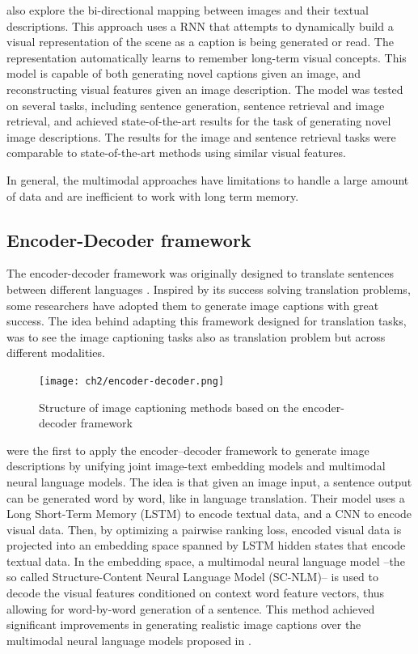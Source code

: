 \citet{Chen2015} also explore the bi-directional mapping between images and their textual descriptions. This approach uses a RNN that attempts to dynamically build a visual representation of the scene as a caption is being generated or read. The representation automatically learns to remember long-term visual concepts. This model is capable of both generating novel captions given an image, and reconstructing visual features given an image description. The model was tested on several tasks, including sentence generation, sentence retrieval and image retrieval, and achieved state-of-the-art results for the task of generating novel image descriptions. The results for the image and sentence retrieval tasks were comparable to state-of-the-art methods using similar visual features.

In general, the multimodal approaches have limitations to handle a large amount of data and are inefficient to work with long term memory.

\subsection{Encoder-Decoder framework}\label{sec:encoder-decoder_framework}

The encoder-decoder framework was originally designed to translate sentences between different languages \citep{Kalchbrenner2013, Sutskever2014, Cho2014}. Inspired by its success solving translation problems, some researchers have adopted them to generate image captions with great success. The idea behind adapting this framework designed for translation tasks, was to see the image captioning tasks also as translation problem but across different modalities. 

\begin{figure}[hpt]
	\centering
	\texttt{[image: ch2/encoder-decoder.png]}
	\caption{Structure of image captioning methods based on the encoder-decoder framework}
	\label{fig:encoder-decoder}
\end{figure}

\citet{Kiros2014_LBL} were the first to apply the encoder–decoder framework to generate image descriptions by unifying joint image-text embedding models and multimodal neural language models. The idea is that given an image input, a sentence output can be generated word by word, like in language translation. Their model uses a Long Short-Term Memory (LSTM) \citep{Hochreiter1997} to encode textual data, and a CNN to encode visual data. Then, by optimizing a pairwise ranking loss, encoded visual data is projected into an embedding space spanned by LSTM  hidden states that encode textual data. In the embedding space, a multimodal neural language model --the so called Structure-Content Neural Language Model (SC-NLM)-- is used to decode the visual features conditioned on context word feature vectors, thus allowing for word-by-word generation of a sentence. This method achieved significant improvements in generating realistic image captions over the multimodal neural language models proposed in \citep{Kiros2014_VS}.

